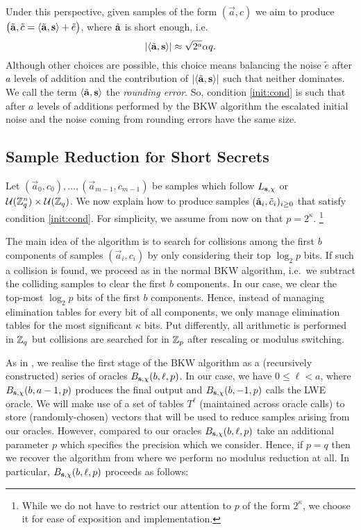 Under this perspective, given samples of the form $(\vec{a}, c)$ we aim to produce 
$\big(\tilde{\mathbf{a}},\tilde c=\left\langle {\tilde{\mathbf{a}}},{\mathbf{s}}\right\rangle+\tilde e\big)$,  where $\tilde{\mathbf{a}}$ is short enough, i.e. 
\begin{equation} \label{init:cond}
\left|\left\langle {\tilde{\mathbf{a}}},{\mathbf{s}}\right\rangle\right| \approx \sqrt{2^{a}}\alpha q.
\end{equation}
Although other choices are possible, this choice means balancing the noise $\tilde e$ after $a$ levels of addition and the contribution of 
$\left|\left\langle {\tilde{\mathbf{a}}},{\mathbf{s}}\right\rangle\right|$ such that neither dominates.
We call the term $\left\langle {\tilde{\mathbf{a}}},{\mathbf{s}}\right\rangle$ the {\it rounding error}. So, condition \eqref{init:cond} is such that  
after $a$ levels of additions performed by the BKW algorithm the escalated initial noise and the noise coming 
from rounding errors have the same size.

\subsection{Sample Reduction for Short Secrets}
Let $(\vec{a}_0, c_0), \ldots, (\vec{a}_{m-1}, c_{m-1}) $ be samples which follow $L_{\mathbf{s},\chi}$ or $\mathcal{U}(\mathbb{Z}_q^n) \times \mathcal{U}(\mathbb{Z}_q)$. We now explain how to produce samples $(\tilde{\mathbf{a}}_i, \tilde c_i)_{i \geq 0}$ that satisfy condition \eqref{init:cond}.  For simplicity,  we assume from now on that $p = 2^\kappa$. \footnote{While we do not have to restrict our attention to $p$ of the form $2^\kappa$, we choose it for ease of exposition and implementation.}

The main idea of the algorithm is to search for collisions among the first $b$ components of samples $(\vec{a}_i,c_i)$ by only considering their top $\log_2 p$ bits. If such a collision is found, we proceed as in the normal BKW algorithm, i.e.\ we subtract the colliding samples to clear the first $b$ components. In our case, we clear the top-most $\log_2 p$ bits of the first $b$ components. Hence, instead of managing elimination tables for every bit of all components, we only manage elimination tables for the most significant $\kappa$ bits. Put differently, all arithmetic is performed in $\mathbb{Z}_q$ but collisions are searched for in $\mathbb{Z}_p$ after rescaling or modulus switching.

As in \cite{albrecht-cid-faugere-fitzpatrick-perret:dcc2013}, we realise the first stage of the BKW algorithm as a (recursively constructed) series of oracles $B_{\mathbf{s},\chi}(b,\ell,p)$. In our case, we have $0 \leq \ell < a$, where $B_{\mathbf{s},\chi}(b,a-1,p)$ produces the final output and $B_{\mathbf{s},\chi}(b,-1,p)$ calls the LWE oracle. 
We will make use of a set of tables $T^{\ell}$ (maintained across oracle calls) to store (randomly-chosen) vectors that will be used to reduce samples arising from our oracles. However, compared to \cite{albrecht-cid-faugere-fitzpatrick-perret:dcc2013} our oracles $B_{\mathbf{s},\chi}(b,\ell,p)$ take an additional parameter $p$  which specifies the precision which we consider. Hence, if $p = q$ then we recover the algorithm from \cite{albrecht-cid-faugere-fitzpatrick-perret:dcc2013} where we perform no modulus reduction at all. In particular, $B_{\mathbf{s},\chi}(b,\ell,p)$ proceeds as follows:

